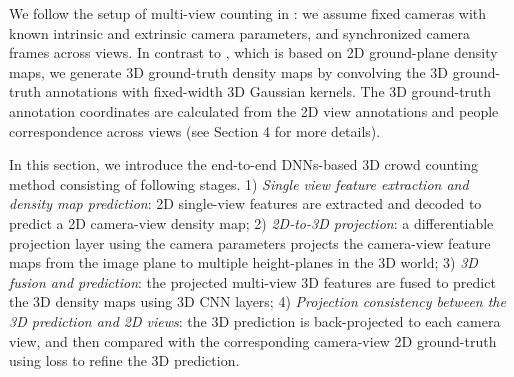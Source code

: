 \documentclass[letterpaper]{article} %
\newcommand{\citealp}[1]{\citeauthor{#1} \citeyear{#1}}
\begin{document}
We follow the setup of multi-view counting in \citealp{zhang2019wide}: we assume fixed cameras with known intrinsic and extrinsic camera parameters, and synchronized camera frames across views. In contrast to \citealp{zhang2019wide}, which is based on 2D ground-plane density maps, we generate 3D ground-truth density maps %
by convolving the 3D ground-truth annotations with fixed-width 3D Gaussian kernels. The 3D ground-truth annotation coordinates are calculated from the 2D view annotations and people correspondence across views (see Section 4 for more details).

In this section, we introduce the end-to-end DNNs-based 3D crowd counting method %
consisting of following stages. 1) \emph{Single view feature extraction and density map prediction}: 2D single-view features are extracted and  decoded to predict a 2D camera-view density map; 2) \emph{2D-to-3D projection}: a differentiable projection layer using the camera parameters projects the camera-view feature maps from the image plane to multiple height-planes in the 3D world; 3) \emph{3D fusion and prediction}: the projected multi-view 3D features are fused to predict the 3D density maps using 3D CNN layers; 4) \emph{Projection consistency between the 3D prediction and 2D views}: the 3D prediction is back-projected to each camera view, %
and then compared with the corresponding camera-view 2D ground-truth using loss to refine the 3D prediction.
\end{document}
